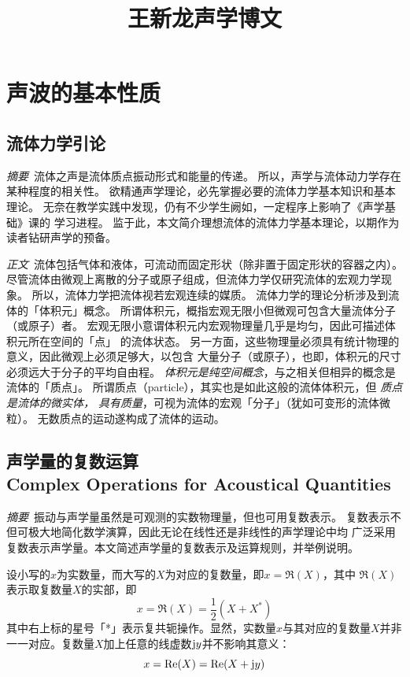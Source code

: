 \documentclass[UTF8]{ctexbook}
\title{王新龙声学博文}
\let\stdsection\section
\renewcommand\section{\newpage\stdsection}
\begin{document}
\maketitle

\tableofcontents

\chapter{声波的基本性质}
\section{流体力学引论}

\emph{摘要}\ 流体之声是流体质点振动形式和能量的传递。
所以，声学与流体动力学存在某种程度的相关性。
欲精通声学理论，必先掌握必要的流体力学基本知识和基本理论。
无奈在教学实践中发现，仍有不少学生阙如，一定程序上影响了《声学基础》课的
学习进程。
监于此，本文简介理想流体的流体力学基本理论，以期作为读者钻研声学的预备。

\emph{正文}\ 流体包括气体和液体，可流动而固定形状（除非置于固定形状的容器之内）。
尽管流体由微观上离散的分子或原子组成，但流体力学仅研究流体的宏观力学现象。
所以，流体力学把流体视若宏观连续的媒质。
流体力学的理论分析涉及到流体的「体积元」概念。
所谓体积元，概指宏观无限小但微观可包含大量流体分子（或原子）者。
宏观无限小意谓体积元内宏观物理量几乎是均匀，因此可描述体积元所在空间的「点」
的流体状态。
另一方面，这些物理量必须具有统计物理的意义，因此微观上必须足够大，以包含
大量分子（或原子），也即，体积元的尺寸必须远大于分子的平均自由程。
\emph{体积元是纯空间概念}，与之相关但相异的概念是流体的「质点」。
所谓质点（particle），其实也是如此这般的流体体积元，但\emph{
	质点是流体的微实体，
具有质量}，可视为流体的宏观「分子」（犹如可变形的流体微粒）。
无数质点的运动遂构成了流体的运动。

\section{声学量的复数运算\\
Complex Operations for Acoustical Quantities}

\emph{摘要}\ 振动与声学量虽然是可观测的实数物理量，但也可用复数表示。
复数表示不但可极大地简化数学演算，因此无论在线性还是非线性的声学理论中均
广泛采用复数表示声学量。本文简述声学量的复数表示及运算规则，并举例说明。

设小写的$x$为实数量，而大写的$X$为对应的复数量，即$x=\Re(X)$，其中
$\Re(X)$表示取复数量$X$的实部，即
$$
x = \Re(X) = \frac12(X+X^*)
$$
其中右上标的星号「*」表示复共轭操作。显然，实数量$x$与其对应的复数量$X$并非
一一对应。复数量$X$加上任意的线虚数$\mathrm{j} y$并不影响其意义：
$$
x = \Re(X) = \Re(X+\mathrm{j} y)
$$
\end{document}

